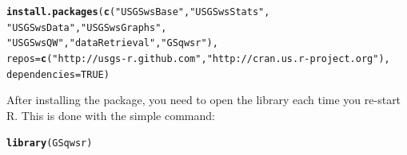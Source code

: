 \documentclass[a4paper,11pt]{article}\usepackage[]{graphicx}\usepackage[]{color}
\makeatletter
\newcommand{\hlnum}[1]{\textcolor[rgb]{0.686,0.059,0.569}{#1}}%
\newcommand{\hlstr}[1]{\textcolor[rgb]{0.192,0.494,0.8}{#1}}%
\newcommand{\hlstd}[1]{\textcolor[rgb]{0.345,0.345,0.345}{#1}}%
\newcommand{\hlkwc}[1]{\textcolor[rgb]{0.333,0.667,0.333}{#1}}%
\newcommand{\hlkwd}[1]{\textcolor[rgb]{0.737,0.353,0.396}{\textbf{#1}}}%
\newenvironment{kframe}{%
 \def\at@end@of@kframe{}%
 \ifinner\ifhmode%
  \def\at@end@of@kframe{\end{minipage}}%
  \begin{minipage}{\columnwidth}%
 \fi\fi%
 \def\FrameCommand##1{\hskip\@totalleftmargin \hskip-\fboxsep
 \colorbox{shadecolor}{##1}\hskip-\fboxsep
     \hskip-\linewidth \hskip-\@totalleftmargin \hskip\columnwidth}%
 \MakeFramed {\advance\hsize-\width
   \@totalleftmargin\z@ \linewidth\hsize
   \@setminipage}}%
 {\par\unskip\endMakeFramed%
 \at@end@of@kframe}
\newenvironment{knitrout}{}{} %
\makeatother
\begin{document}
\begin{knitrout}
\color{fgcolor}\begin{kframe}
\begin{alltt}
\hlkwd{install.packages}\hlstd{(}\hlkwd{c}\hlstd{(}\hlstr{"USGSwsBase"}\hlstd{,}\hlstr{"USGSwsStats"}\hlstd{,}
                   \hlstr{"USGSwsData"}\hlstd{,}\hlstr{"USGSwsGraphs"}\hlstd{,}
                   \hlstr{"USGSwsQW"}\hlstd{,}\hlstr{"dataRetrieval"}\hlstd{,}\hlstr{"GSqwsr"}\hlstd{),}
      \hlkwc{repos}\hlstd{=}\hlkwd{c}\hlstd{(}\hlstr{"http://usgs-r.github.com"}\hlstd{,}\hlstr{"http://cran.us.r-project.org"}\hlstd{),}
      \hlkwc{dependencies}\hlstd{=}\hlnum{TRUE}\hlstd{)}
\end{alltt}
\end{kframe}
\end{knitrout}


After installing the package, you need to open the library each time you re-start R.  This is done with the simple command:
\begin{knitrout}
\color{fgcolor}\begin{kframe}
\begin{alltt}
\hlkwd{library}\hlstd{(GSqwsr)}
\end{alltt}
\end{kframe}
\end{knitrout}
\end{document}
